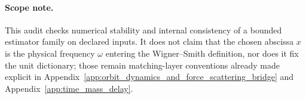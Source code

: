 \paragraph{Scope note.}
\AuditTag This audit checks numerical stability and internal consistency of a bounded estimator family on declared inputs.
It does not claim that the chosen abscissa $x$ is the physical frequency $\omega$ entering the Wigner--Smith definition, nor does it fix the unit dictionary; those remain matching-layer conventions already made explicit in Appendix~\ref{app:orbit_dynamics_and_force_scattering_bridge} and Appendix~\ref{app:time_mass_delay}.
